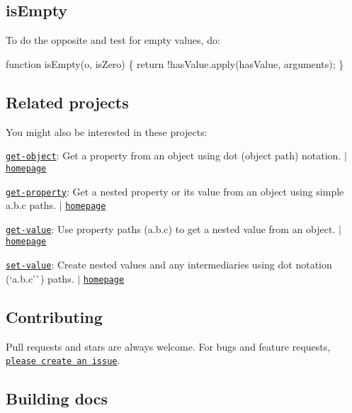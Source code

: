 \subsection*{is\+Empty}

To do the opposite and test for empty values, do\+:


\begin{DoxyCode}
function isEmpty(o, isZero) \{
  return !hasValue.apply(hasValue, arguments);
\}
\end{DoxyCode}


\subsection*{Related projects}

You might also be interested in these projects\+:


\begin{DoxyItemize}
\item \href{https://www.npmjs.com/package/get-object}{\tt get-\/object}\+: Get a property from an object using dot (object path) notation. $\vert$ \href{https://github.com/jonschlinkert/get-object}{\tt homepage}
\item \href{https://www.npmjs.com/package/get-property}{\tt get-\/property}\+: Get a nested property or its value from an object using simple {\ttfamily a.\+b.\+c} paths. $\vert$ \href{https://github.com/jonschlinkert/get-property}{\tt homepage}
\item \href{https://www.npmjs.com/package/get-value}{\tt get-\/value}\+: Use property paths ({\ttfamily a.\+b.\+c}) to get a nested value from an object. $\vert$ \href{https://github.com/jonschlinkert/get-value}{\tt homepage}
\item \href{https://www.npmjs.com/package/set-value}{\tt set-\/value}\+: Create nested values and any intermediaries using dot notation (`\textquotesingle{}a.\+b.\+c'\`{}) paths. $\vert$ \href{https://github.com/jonschlinkert/set-value}{\tt homepage}
\end{DoxyItemize}

\subsection*{Contributing}

Pull requests and stars are always welcome. For bugs and feature requests, \href{https://github.com/jonschlinkert/has-value/issues/new}{\tt please create an issue}.

\subsection*{Building docs}

